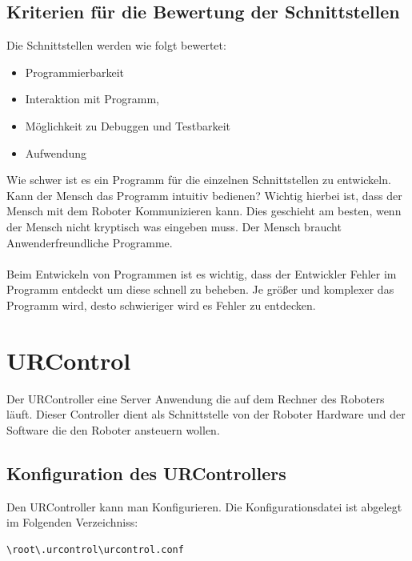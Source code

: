 \subsection{Kriterien für die Bewertung der Schnittstellen}
\label{sub:criterias_of_solutions_kon}

Die Schnittstellen werden wie folgt bewertet:

\begin{itemize}
\item Programmierbarkeit
\item Interaktion mit Programm,
\item Möglichkeit zu Debuggen und Testbarkeit
\item Aufwendung
\end{itemize}

Wie schwer ist es ein Programm für die einzelnen Schnittstellen zu entwickeln.
Kann der Mensch das Programm intuitiv bedienen? Wichtig hierbei ist, dass der Mensch mit dem Roboter Kommunizieren kann. Dies geschieht am besten, wenn der Mensch nicht kryptisch was eingeben muss. Der Mensch braucht Anwenderfreundliche Programme.
\\\\
Beim Entwickeln von Programmen ist es wichtig, dass der Entwickler Fehler im Programm entdeckt um diese schnell zu beheben.
Je größer und komplexer das Programm wird, desto schwieriger wird es Fehler zu entdecken.

\section{URControl}
\label{sec:ur_control_gru}

Der URController eine Server Anwendung die auf dem Rechner des Roboters läuft. 
Dieser Controller dient als Schnittstelle von der Roboter Hardware und der Software die den Roboter ansteuern wollen. 

\subsection{Konfiguration des URControllers}
\label{urcontrol_rci_gru}

Den URController kann man Konfigurieren. Die Konfigurationsdatei ist abgelegt im Folgenden Verzeichniss:
\begin{lstlisting}
\root\.urcontrol\urcontrol.conf
\end{lstlisting}

